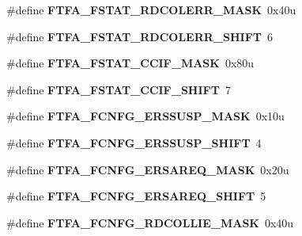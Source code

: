 \begin{DoxyCompactItemize}
\#define {\bfseries F\+T\+F\+A\+\_\+\+F\+S\+T\+A\+T\+\_\+\+R\+D\+C\+O\+L\+E\+R\+R\+\_\+\+M\+A\+SK}~0x40u
\item 
\mbox{\label{group___f_t_f_a___register___masks_ga4d4481b6c7d09a3bd6969cdf66a00d75}} 
\#define {\bfseries F\+T\+F\+A\+\_\+\+F\+S\+T\+A\+T\+\_\+\+R\+D\+C\+O\+L\+E\+R\+R\+\_\+\+S\+H\+I\+FT}~6
\item 
\mbox{\label{group___f_t_f_a___register___masks_ga7c3a9f7d0c5882721425d4c46b27a24d}} 
\#define {\bfseries F\+T\+F\+A\+\_\+\+F\+S\+T\+A\+T\+\_\+\+C\+C\+I\+F\+\_\+\+M\+A\+SK}~0x80u
\item 
\mbox{\label{group___f_t_f_a___register___masks_ga14a29b83c4f1b2e67a066799a46863f6}} 
\#define {\bfseries F\+T\+F\+A\+\_\+\+F\+S\+T\+A\+T\+\_\+\+C\+C\+I\+F\+\_\+\+S\+H\+I\+FT}~7
\item 
\mbox{\label{group___f_t_f_a___register___masks_ga0fc6d10ebdf1a45172f3c8291fdee94c}} 
\#define {\bfseries F\+T\+F\+A\+\_\+\+F\+C\+N\+F\+G\+\_\+\+E\+R\+S\+S\+U\+S\+P\+\_\+\+M\+A\+SK}~0x10u
\item 
\mbox{\label{group___f_t_f_a___register___masks_ga7586fcfe862202cd864fec542db66458}} 
\#define {\bfseries F\+T\+F\+A\+\_\+\+F\+C\+N\+F\+G\+\_\+\+E\+R\+S\+S\+U\+S\+P\+\_\+\+S\+H\+I\+FT}~4
\item 
\mbox{\label{group___f_t_f_a___register___masks_gac92e8d3d354f7352b8bd61086327d16d}} 
\#define {\bfseries F\+T\+F\+A\+\_\+\+F\+C\+N\+F\+G\+\_\+\+E\+R\+S\+A\+R\+E\+Q\+\_\+\+M\+A\+SK}~0x20u
\item 
\mbox{\label{group___f_t_f_a___register___masks_ga0879413588f696dfe9f6a1c849103753}} 
\#define {\bfseries F\+T\+F\+A\+\_\+\+F\+C\+N\+F\+G\+\_\+\+E\+R\+S\+A\+R\+E\+Q\+\_\+\+S\+H\+I\+FT}~5
\item 
\mbox{\label{group___f_t_f_a___register___masks_gae9ad4a9aac7c5ef332e4c7d7af0a63a9}} 
\#define {\bfseries F\+T\+F\+A\+\_\+\+F\+C\+N\+F\+G\+\_\+\+R\+D\+C\+O\+L\+L\+I\+E\+\_\+\+M\+A\+SK}~0x40u

\end{DoxyCompactItemize}
